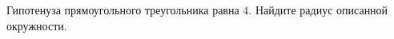 \begin{ex}
	\begin{condition}
		Гипотенуза прямоугольного треугольника равна \( 4 \). Найдите радиус описанной окружности.
	\end{condition}
\end{ex}
